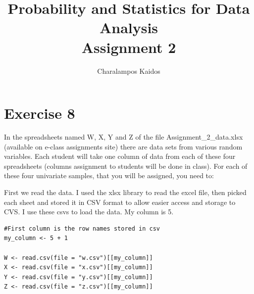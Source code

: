 \documentclass{article}
\begin{document}
\title{Probability and Statistics for Data Analysis\\Assignment 2}
\author{Charalampos Kaidos}

\maketitle

\section*{Exercise 8}

In the spreadsheets named W, X, Y and Z of the file Assignment\_2\_data.xlsx
(available on e-class assignments site) there are data sets from various random
variables. Each student will take one column of data from each of these four
spreadsheets (columns assignment to students will be done in class). For each of
these four univariate samples, that you will be assigned, you need to:

First we read the data. I used the xlsx library to read the excel file, then
picked each sheet and stored it in CSV format to allow easier access and storage
to CVS. I use these csvs to load the data. My column is 5.

\begin{lstlisting}
#First column is the row names stored in csv
my_column <- 5 + 1 

W <- read.csv(file = "w.csv")[[my_column]]
X <- read.csv(file = "x.csv")[[my_column]]
Y <- read.csv(file = "y.csv")[[my_column]]
Z <- read.csv(file = "z.csv")[[my_column]]
\end{lstlisting}
\end{document}
